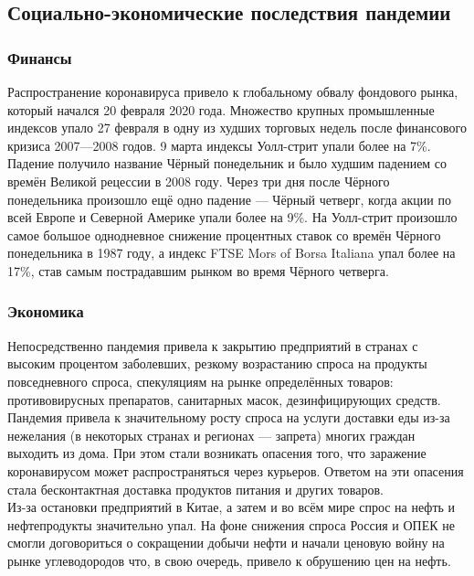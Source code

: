 \documentclass[a4paper, 12pt]{extarticle}
\begin{document}
\subsection{Социально-экономические последствия пандемии}
\subsubsection{Финансы}

Распространение коронавируса привело к глобальному обвалу фондового рынка,
который начался 20 февраля 2020 года. Множество крупных промышленные индексов
упало 27 февраля в одну из худших торговых недель после финансового кризиса
2007—2008 годов. 9 марта индексы Уолл-стрит упали более на 7\%. Падение
получило название Чёрный понедельник и было худшим падением со времён Великой
рецессии в 2008 году. Через три дня после Чёрного понедельника произошло ещё
одно падение — Чёрный четверг, когда акции по всей Европе и Северной Америке
упали более на 9\%. На Уолл-стрит произошло самое большое однодневное снижение
процентных ставок со времён Чёрного понедельника в 1987 году, а индекс FTSE
Mors of Borsa Italiana упал более на 17\%, став самым пострадавшим рынком во время Чёрного четверга.

\subsubsection{Экономика}

Непосредственно пандемия привела к закрытию предприятий в странах с высоким
процентом заболевших, резкому возрастанию спроса на продукты повседневного
спроса, спекуляциям на рынке определённых товаров: противовирусных препаратов,
санитарных масок, дезинфицирующих средств.
\\

Пандемия привела к значительному росту спроса на услуги доставки еды из-за
нежелания (в некоторых странах и регионах — запрета) многих граждан выходить из
дома. При этом стали возникать опасения того, что заражение коронавирусом может
распространяться через курьеров. Ответом на эти опасения стала бесконтактная
доставка продуктов питания и других товаров.
\\

Из-за остановки предприятий в Китае, а затем и во всём мире спрос на нефть и
нефтепродукты значительно упал. На фоне снижения спроса Россия и ОПЕК не смогли
договориться о сокращении добычи нефти и начали ценовую войну на рынке
углеводородов что, в свою очередь, привело к обрушению цен на нефть.
\\
\end{document}
